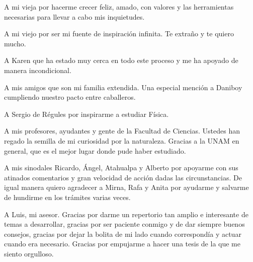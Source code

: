 A mi vieja por hacerme crecer feliz, amado, con valores y las herramientas necesarias para llevar a cabo mis inquietudes. 

A mi viejo por ser mi fuente de inspiración infinita. Te extraño y te quiero mucho.

A Karen que ha estado muy cerca en todo este proceso y me ha apoyado de manera incondicional. 

A mis amigos que son mi familia extendida. Una especial mención a Daniboy cumpliendo nuestro pacto entre caballeros. 

A Sergio de Régules por inspirarme a estudiar Física.

A mis profesores, ayudantes y gente de la Facultad de Ciencias. Ustedes han regado la semilla de mi curiosidad por la naturaleza. Gracias a la UNAM en general, que es el mejor lugar donde pude haber estudiado.

A mis sinodales Ricardo, Ángel, Atahualpa y Alberto por apoyarme con sus atinados comentarios y gran velocidad de acción dadas las circunstancias. De igual manera quiero agradecer a Mirna, Rafa y Anita por ayudarme y salvarme de hundirme en los trámites varias veces. 

A Luis, mi asesor. Gracias por darme un repertorio tan amplio e interesante de temas a desarrollar, gracias por ser paciente conmigo y de dar siempre buenos consejos, gracias por dejar la bolita de mi lado cuando correspondía y actuar cuando era necesario. Gracias por empujarme a hacer una tesis de la que me siento orgulloso. 


